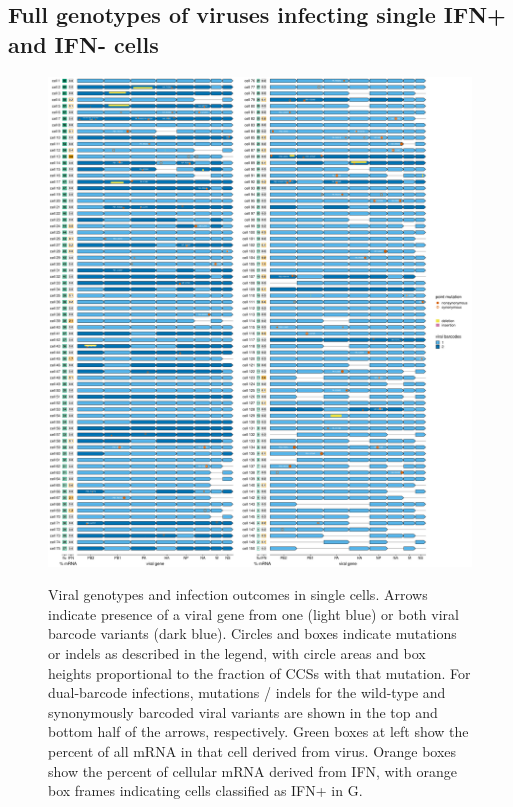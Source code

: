 \documentclass[9pt,lineno]{elife}
\begin{document}
\subsection{Full genotypes of viruses infecting single IFN+ and IFN- cells}

\begin{figure}
\begin{fullwidth}
{\centering
\includegraphics[height=0.78\textheight]{figures/single_cell_figures/p_genotypes.pdf}
}
\caption{
Viral genotypes and infection outcomes in single cells.
Arrows indicate presence of a viral gene from one (light blue) or both viral barcode variants (dark blue).
Circles and boxes indicate mutations or indels as described in the legend, with circle areas and box heights proportional to the fraction of CCSs with that mutation.
For dual-barcode infections, mutations / indels for the wild-type and synonymously barcoded viral variants are shown in the top and bottom half of the arrows, respectively. 
Green boxes at left show the percent of all mRNA in that cell derived from virus.
Orange boxes show the percent of cellular mRNA derived from IFN, with orange box frames indicating cells classified as IFN+ in G.
}
\label{fig:genotypes}


\end{fullwidth}
\end{figure}
\end{document}
